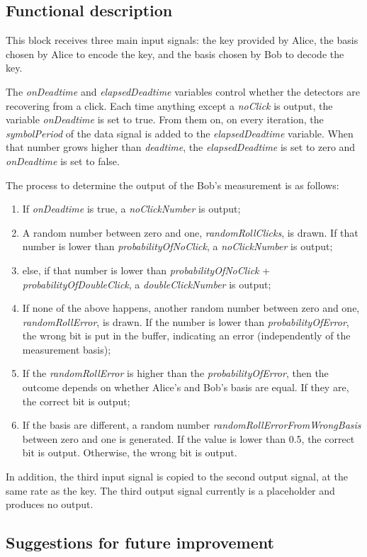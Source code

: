 \subsection*{Functional description}
This block receives three main input signals: the key provided by Alice, the basis
chosen by Alice to encode the key, and the basis chosen by Bob to decode the
key.

The \textit{onDeadtime} and \textit{elapsedDeadtime} variables control whether
the detectors are recovering from a click. Each time anything except a \textit{noClick} is
output, the variable \textit{onDeadtime} is set to true. From them on, on every
iteration, the \textit{symbolPeriod} of the data signal is added to the
\textit{elapsedDeadtime} variable. When that number grows higher than
\textit{deadtime}, the \textit{elapsedDeadtime} is set to zero and
\textit{onDeadtime} is set to false.

The process to determine the output of the Bob's measurement is as follows:

\begin{enumerate}
	\item If \textit{onDeadtime} is true, a \textit{noClickNumber} is output;
	\item A random number between zero and one, \textit{randomRollClicks}, is drawn. If that number is lower
	than \textit{probabilityOfNoClick}, a \textit{noClickNumber} is output;
	\item else, if that number is lower than \textit{probabilityOfNoClick} +
	\textit{probabilityOfDoubleClick}, a \textit{doubleClickNumber} is output;
	\item If none of the above happens, another random number between zero and one, \textit{randomRollError}, is drawn. If the number is
	lower than \textit{probabilityOfError}, the wrong bit is put in the buffer,
	indicating an error (independently of the measurement basis);
	\item If the \textit{randomRollError} is higher than the
	\textit{probabilityOfError}, then the outcome depends on whether Alice's and
	Bob's basis are equal. If they are, the correct bit is output;
	\item If the basis are different, a random number
	\textit{randomRollErrorFromWrongBasis} between zero and one is generated. If
	the value is lower than 0.5, the correct bit is output. Otherwise, the wrong
	bit is output.
\end{enumerate}

In addition, the third input signal is copied to the second output signal, at
the same rate as the key. The third output signal currently is a placeholder and
produces no output.

\subsection*{Suggestions for future improvement}
